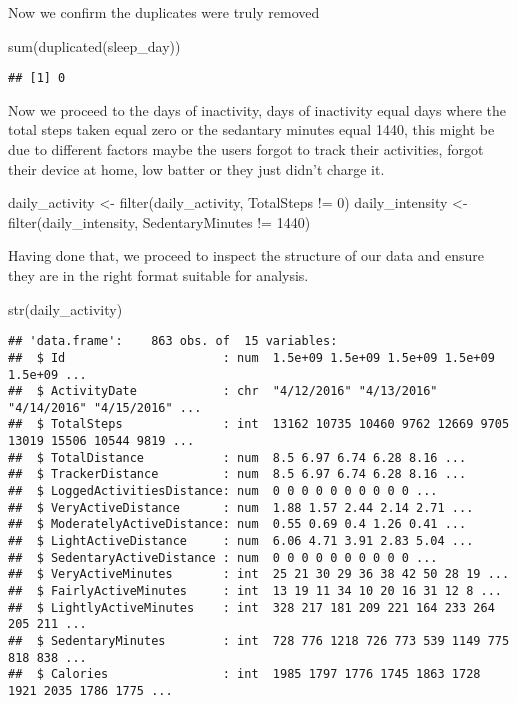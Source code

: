 \documentclass[
]{article}
\newenvironment{Shaded}{\begin{snugshade}}{\end{snugshade}}
\newcommand{\DecValTok}[1]{\textcolor[rgb]{0.00,0.00,0.81}{#1}}
\newcommand{\FunctionTok}[1]{\textcolor[rgb]{0.00,0.00,0.00}{#1}}
\newcommand{\NormalTok}[1]{#1}
\newcommand{\OtherTok}[1]{\textcolor[rgb]{0.56,0.35,0.01}{#1}}
\newcommand{\SpecialCharTok}[1]{\textcolor[rgb]{0.00,0.00,0.00}{#1}}
\begin{document}
Now we confirm the duplicates were truly removed

\begin{Shaded}
\begin{Highlighting}[]
\FunctionTok{sum}\NormalTok{(}\FunctionTok{duplicated}\NormalTok{(sleep\_day))}
\end{Highlighting}
\end{Shaded}

\begin{verbatim}
## [1] 0
\end{verbatim}

Now we proceed to the days of inactivity, days of inactivity equal days
where the total steps taken equal zero or the sedantary minutes equal
1440, this might be due to different factors maybe the users forgot to
track their activities, forgot their device at home, low batter or they
just didn't charge it.

\begin{Shaded}
\begin{Highlighting}[]
\NormalTok{daily\_activity }\OtherTok{\textless{}{-}}  \FunctionTok{filter}\NormalTok{(daily\_activity, TotalSteps }\SpecialCharTok{!=} \DecValTok{0}\NormalTok{)}
\NormalTok{daily\_intensity }\OtherTok{\textless{}{-}} \FunctionTok{filter}\NormalTok{(daily\_intensity, SedentaryMinutes }\SpecialCharTok{!=} \DecValTok{1440}\NormalTok{)}
\end{Highlighting}
\end{Shaded}

Having done that, we proceed to inspect the structure of our data and
ensure they are in the right format suitable for analysis.

\begin{Shaded}
\begin{Highlighting}[]
\FunctionTok{str}\NormalTok{(daily\_activity)}
\end{Highlighting}
\end{Shaded}

\begin{verbatim}
## 'data.frame':    863 obs. of  15 variables:
##  $ Id                      : num  1.5e+09 1.5e+09 1.5e+09 1.5e+09 1.5e+09 ...
##  $ ActivityDate            : chr  "4/12/2016" "4/13/2016" "4/14/2016" "4/15/2016" ...
##  $ TotalSteps              : int  13162 10735 10460 9762 12669 9705 13019 15506 10544 9819 ...
##  $ TotalDistance           : num  8.5 6.97 6.74 6.28 8.16 ...
##  $ TrackerDistance         : num  8.5 6.97 6.74 6.28 8.16 ...
##  $ LoggedActivitiesDistance: num  0 0 0 0 0 0 0 0 0 0 ...
##  $ VeryActiveDistance      : num  1.88 1.57 2.44 2.14 2.71 ...
##  $ ModeratelyActiveDistance: num  0.55 0.69 0.4 1.26 0.41 ...
##  $ LightActiveDistance     : num  6.06 4.71 3.91 2.83 5.04 ...
##  $ SedentaryActiveDistance : num  0 0 0 0 0 0 0 0 0 0 ...
##  $ VeryActiveMinutes       : int  25 21 30 29 36 38 42 50 28 19 ...
##  $ FairlyActiveMinutes     : int  13 19 11 34 10 20 16 31 12 8 ...
##  $ LightlyActiveMinutes    : int  328 217 181 209 221 164 233 264 205 211 ...
##  $ SedentaryMinutes        : int  728 776 1218 726 773 539 1149 775 818 838 ...
##  $ Calories                : int  1985 1797 1776 1745 1863 1728 1921 2035 1786 1775 ...
\end{verbatim}
\end{document}
